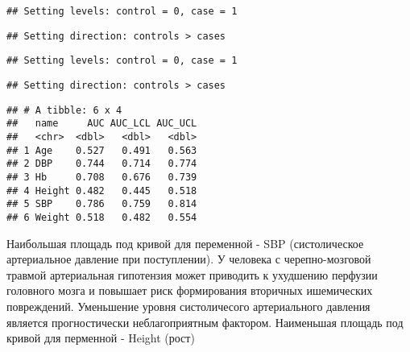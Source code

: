 \documentclass[
]{article}
\begin{document}
\begin{verbatim}
## Setting levels: control = 0, case = 1
\end{verbatim}

\begin{verbatim}
## Setting direction: controls > cases
\end{verbatim}

\begin{verbatim}
## Setting levels: control = 0, case = 1
\end{verbatim}

\begin{verbatim}
## Setting direction: controls > cases
\end{verbatim}

\begin{verbatim}
## # A tibble: 6 x 4
##   name     AUC AUC_LCL AUC_UCL
##   <chr>  <dbl>   <dbl>   <dbl>
## 1 Age    0.527   0.491   0.563
## 2 DBP    0.744   0.714   0.774
## 3 Hb     0.708   0.676   0.739
## 4 Height 0.482   0.445   0.518
## 5 SBP    0.786   0.759   0.814
## 6 Weight 0.518   0.482   0.554
\end{verbatim}

Наибольшая площадь под кривой для переменной - SBP (систолическое
артериальное давление при поступлении). У человека с черепно-мозговой
травмой артериальная гипотензия может приводить к ухудшению перфузии
головного мозга и повышает риск формирования вторичных ишемических
повреждений. Уменьшение уровня систоличесого артериального давления
является прогностически неблагоприятным фактором. Наименьшая площадь под
кривой для перменной - Height (рост)
\end{document}
